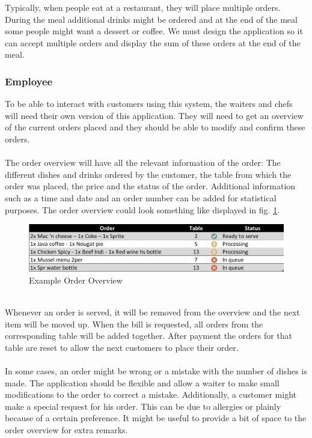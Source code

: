 \documentclass[12pt]{article}
\begin{document}
\noindent
Typically, when people eat at a restaurant, they will place multiple orders. During the meal additional drinks might be ordered and at the end of the meal some people might want a dessert or coffee. We must design the application so it can accept multiple orders and display the sum of these orders at the end of the meal.


\subsubsection{Employee}
To be able to interact with customers using this system, the waiters and chefs will need their own version of this application. They will need to get an overview of the current orders placed and they should be able to modify and confirm these orders.
\\\\
The order overview will have all the relevant information of the order: The different dishes and drinks ordered by the customer, the table from which the order was placed, the price and the status of the order. Additional information such as a time and date and an order number can be added for statistical purposes.
The order overview could look something like displayed in fig. \ref{fig:orderview}.
\begin{figure}[h!]
	\includegraphics[width=\linewidth]{orderview.PNG}
	\caption{Example Order Overview}
	\label{fig:orderview}
\end{figure}
\\
Whenever an order is served, it will be removed from the overview and the next item will be moved up. When the bill is requested, all orders from the corresponding table will be added together. After payment the orders for that table are reset to allow the next customers to place their order.
\\\\
In some cases, an order might be wrong or a mistake with the number of dishes is made. The application should be flexible and allow a waiter to make small modifications to the order to correct a mistake.
Additionally, a customer might make a special request for his order. This can be due to allergies or plainly because of a certain preference. It might be useful to provide a bit of space to the order overview for extra remarks.
\end{document}
